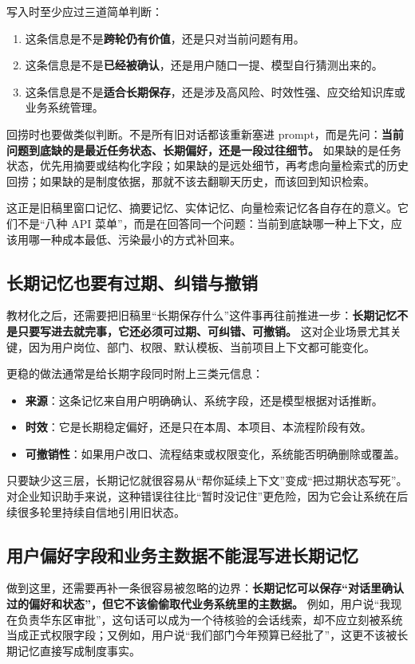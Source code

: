 写入时至少应过三道简单判断：
\begin{enumerate}
  \item 这条信息是不是\textbf{跨轮仍有价值}，还是只对当前问题有用。
  \item 这条信息是不是\textbf{已经被确认}，还是用户随口一提、模型自行猜测出来的。
  \item 这条信息是不是\textbf{适合长期保存}，还是涉及高风险、时效性强、应交给知识库或业务系统管理。
\end{enumerate}

回捞时也要做类似判断。不是所有旧对话都该重新塞进 prompt，而是先问：\textbf{当前问题到底缺的是最近任务状态、长期偏好，还是一段过往细节。} 如果缺的是任务状态，优先用摘要或结构化字段；如果缺的是远处细节，再考虑向量检索式的历史回捞；如果缺的是制度依据，那就不该去翻聊天历史，而该回到知识检索。

这正是旧稿里窗口记忆、摘要记忆、实体记忆、向量检索记忆各自存在的意义。它们不是“八种 API 菜单”，而是在回答同一个问题：{\heiti 当前到底缺哪一种上下文，应该用哪一种成本最低、污染最小的方式补回来。}

\subsection{长期记忆也要有过期、纠错与撤销}
教材化之后，还需要把旧稿里“长期保存什么”这件事再往前推进一步：\textbf{长期记忆不是只要写进去就完事，它还必须可过期、可纠错、可撤销。} 这对企业场景尤其关键，因为用户岗位、部门、权限、默认模板、当前项目上下文都可能变化。

更稳的做法通常是给长期字段同时附上三类元信息：
\begin{itemize}
  \item \textbf{来源}：这条记忆来自用户明确确认、系统字段，还是模型根据对话推断。
  \item \textbf{时效}：它是长期稳定偏好，还是只在本周、本项目、本流程阶段有效。
  \item \textbf{可撤销性}：如果用户改口、流程结束或权限变化，系统能否明确删除或覆盖。
\end{itemize}

只要缺少这三层，长期记忆就很容易从“帮你延续上下文”变成“把过期状态写死”。对企业知识助手来说，这种错误往往比“暂时没记住”更危险，因为它会让系统在后续很多轮里持续自信地引用旧状态。

\subsection{用户偏好字段和业务主数据不能混写进长期记忆}
做到这里，还需要再补一条很容易被忽略的边界：\textbf{长期记忆可以保存“对话里确认过的偏好和状态”，但它不该偷偷取代业务系统里的主数据。} 例如，用户说“我现在负责华东区审批”，这句话可以成为一个待核验的会话线索，却不应立刻被系统当成正式权限字段；又例如，用户说“我们部门今年预算已经批了”，这更不该被长期记忆直接写成制度事实。

